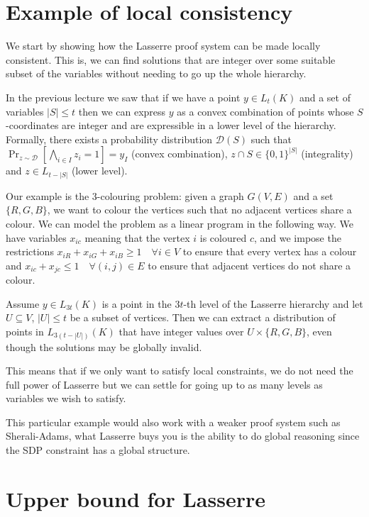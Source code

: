 \documentclass[a4paper,twoside,justified]{tufte-handout}
\begin{document}
 

\section{Example of local consistency}

We start by showing how the Lasserre proof system can be made locally consistent. This is, we can find solutions that are integer over some suitable subset of the variables without needing to go up the whole hierarchy.

In the previous lecture we saw that if we have a point $y\in L_t(K)$ and a set of variables $|S| \leq t$ then we can express $y$ as a convex combination of points whose $S$-coordinates are integer and are expressible in a lower level of the hierarchy. Formally, there exists a probability distribution $\mathcal{D}(S)$ such that $\Pr_{z \sim \mathcal{D}} [ \bigwedge_{i \in I} z_i =1 ] = y_I$ (convex combination), $z \cap S \in \{0,1\}^{|S|}$ (integrality) and $z \in L_{t - |S|}$ (lower level).

Our example is the 3-colouring problem: given a graph $G(V,E)$ and a set $\{R,G,B\}$, we want to colour the vertices such that no adjacent vertices share a colour. We can model the problem as a linear program in the following way. We have variables $x_{ic}$ meaning that the vertex $i$ is coloured $c$, and we impose the restrictions $x_{iR}+x_{iG}+x_{iB} \geq 1 \quad \forall i\in V$ to ensure that every vertex has a colour and $x_{ic} + x_{jc} \leq 1 \quad \forall (i,j) \in E$ to ensure that adjacent vertices do not share a colour.

Assume $y \in L_{3t}(K)$ is a point in the $3t$-th level of the Lasserre hierarchy and let $U \subseteq V$, $|U| \leq t$ be a subset of vertices. Then we can extract a distribution of points in $L_{3(t-|U|)}(K)$ that have integer values over $U \times \{R,G,B\}$, even though the solutions may be globally invalid.

This means that if we only want to satisfy local constraints, we do not need the full power of Lasserre but we can settle for going up to as many levels as variables we wish to satisfy.

This particular example would also work with a weaker proof system such as Sherali-Adams, what Lasserre buys you is the ability to do global reasoning since the SDP constraint has a global structure.

\section{Upper bound for Lasserre}
\end{document}
